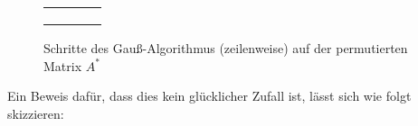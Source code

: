 \begin{figure}
	\begin{tabular}{cccc}
		\spymatrix{\matrixpeoa} & \spymatrix{\matrixpeob} & \spymatrix{\matrixpeoc} & \spymatrix{\matrixpeod} \\
		\multicolumn{4}{c}{\vspace{0.1cm}}                                                                    \\
		\spymatrix{\matrixpeoe} & \spymatrix{\matrixpeof} & \spymatrix{\matrixpeog} & \spymatrix{\matrixpeoh}
	\end{tabular}
	\caption{Schritte des Gauß-Algorithmus (zeilenweise) auf der permutierten Matrix \( A^{\ast} \)}
	\label{fig:gauss02}
\end{figure}

Ein Beweis dafür, dass dies kein glücklicher Zufall ist, lässt sich wie folgt skizzieren:

